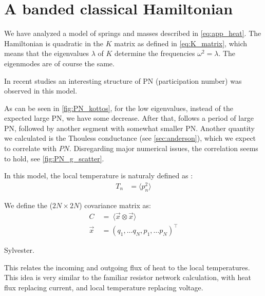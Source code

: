 \section{A banded classical Hamiltonian}%


We have analyzed a model of springs and masses described in \autoref{eq:app_heat}.
The Hamiltonian is quadratic in the $K$ matrix as defined in \autoref{eq:K_matrix},
which means that the eigenvalues $\lambda$ of $K$ determine the frequencies $\omega^2 = \lambda$.
The eigenmodes are of course the same.

In recent studies \cite{bodyfelt_unpub} an interesting structure of
PN (participation number) was observed in this model. 

As can be seen
in \autoref{fig:PN_kottos}, for the low eigenvalues, instead of the 
expected large PN, we have some decrease. After that, follows a period
of large PN, followed by another segment with somewhat smaller PN.
Another quantity we calculated is the Thouless conductance (see \autoref{sec:anderson}), 
which we expect to correlate with $PN$. Disregarding major numerical issues,
the correlation seems to hold, see \autoref{fig:PN_g_scatter}.



In this model, the local temperature is naturaly defined as :
%
\begin{align}
T_n &= \langle p_n^2 \rangle
\end{align}

We define the ($2N\times 2N$) covariance matrix as:
\begin{align}
C \ &=\ \langle \vec{x}\otimes \vec{x}\rangle \\
\vec{x} &= (q_1,\ldots q_N, p_1,\ldots p_N)^\intercal
\end{align}


Sylvester.


This relates the incoming and outgoing flux of heat 
to the local temperatures. This idea is very similar
to the familiar resistor network calculation, with 
heat flux replacing current, and local temperature replacing voltage. 
 
